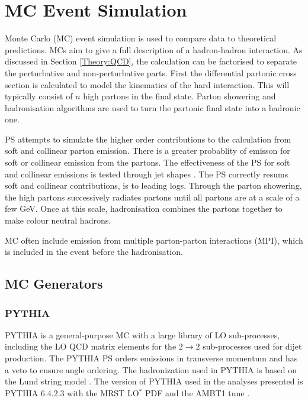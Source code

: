 \section{MC Event Simulation}
\label{Theory:MC}


Monte Carlo (MC) event simulation is used to compare data to theoretical predictions. 
MCs aim to give a full description of a hadron-hadron interaction.
As discussed in Section \ref{Theory:QCD}, the calculation can be factorised to separate the perturbative and non-perturbative parts. 
First the differential partonic cross section is calculated to model the kinematics of the hard interaction.
This will typically consist of $n$ high \pt{} partons in the final state.
Parton showering and hadronisation algorithms are used to turn the partonic final state into a hadronic one.

PS attempts to simulate the higher order contributions to the calculation from soft and collinear parton emission.
There is a greater probablity of emisson for soft or collinear emission from the partons.
The effectiveness of the PS for soft and collinear emissions is tested through jet shapes \cite{ref:JetSh}.
The PS correctly resums soft and collinear contributions, is to leading logs.
Through the parton showering, the high \pt{} partons successively radiates partons until all partons are at a scale of a few GeV.
Once at this scale, hadronisation combines the partons together to make colour neutral hadrons. 

MC often include emission from multiple parton-parton interactions (MPI), which is included in the event before the hadronisation.



\subsection{MC Generators}
\subsubsection{PYTHIA}

PYTHIA \cite{ref:PYTHIA64} is a general-purpose MC with a large library of LO sub-processes, including the LO QCD matrix elements for the $2 \rightarrow 2$ sub-processes used for dijet production.
The PYTHIA PS orders emissions in transverse momentum and has a veto to ensure angle ordering. 
The hadronization used in PYTHIA is based on the Lund string model \cite{ref:Lund}.
The version of PYTHIA used in the analyses presented is PYTHIA 6.4.2.3 with the MRST LO$^*$ PDF \cite{ref:MRST} and the AMBT1 tune \cite{ref:Tune}.

